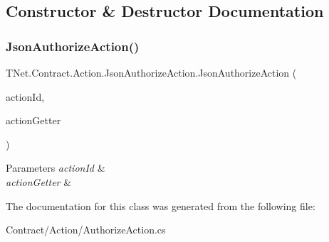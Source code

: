 \subsection{Constructor \& Destructor Documentation}
\mbox{\label{class_t_net_1_1_contract_1_1_action_1_1_json_authorize_action_aab4612059a2796006de7c5c97c16a61f}} 
\subsubsection{\texorpdfstring{Json\+Authorize\+Action()}{JsonAuthorizeAction()}}
{\footnotesize\ttfamily T\+Net.\+Contract.\+Action.\+Json\+Authorize\+Action.\+Json\+Authorize\+Action (\begin{DoxyParamCaption}\item[{int}]{action\+Id,  }\item[{\mbox{\hyperlink{class_t_net_1_1_service_1_1_action_getter}{Action\+Getter}}}]{action\+Getter }\end{DoxyParamCaption})\hspace{0.3cm}{\ttfamily [protected]}}






\begin{DoxyParams}{Parameters}
{\em action\+Id} & \\
\hline
{\em action\+Getter} & \\
\hline
\end{DoxyParams}


The documentation for this class was generated from the following file\+:\begin{DoxyCompactItemize}
\item 
Contract/\+Action/Authorize\+Action.\+cs\end{DoxyCompactItemize}
